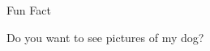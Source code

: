 \begin{cventries}
  \cventry
    {Fun Fact} %
    {} %
    {} %
    {} %
    {
      \begin{cvitems} %
        \item {Do you want to see pictures of my dog?}
      \end{cvitems}
    }
\end{cventries}
